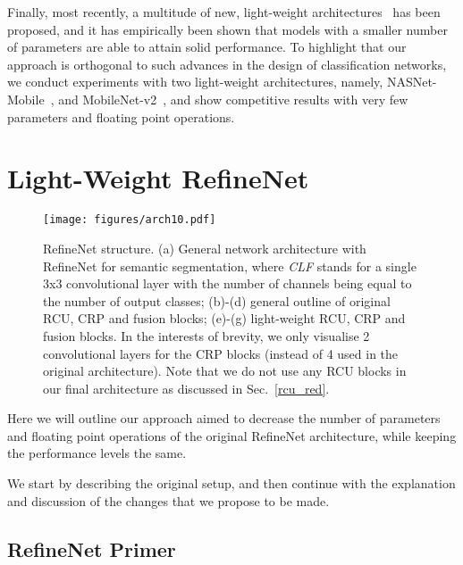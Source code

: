 \documentclass{bmvc2k}
\begin{document}
Finally, most recently, a multitude of new, light-weight architectures~\cite{IandolaMAHDK16,HowardZCKWWAA17} has been proposed, and it has empirically been shown that models with a smaller number of parameters are able to attain solid performance. To highlight that our approach is orthogonal to such advances in the design of classification networks, we conduct experiments with two light-weight architectures, namely, NASNet-Mobile~\cite{ZophVSL17}, and MobileNet-v2~\cite{abs-1801-04381}, and show competitive results with very few parameters and floating point operations.
\vspace{-0.12in}

\section{Light-Weight RefineNet}
\label{sec:blind}






\begin{figure*}
\begin{center}
	\texttt{[image: figures/arch10.pdf]}
\end{center}
	\vskip -0.23in
	\caption{RefineNet structure. (a) General network architecture with RefineNet for semantic segmentation, where \textit{CLF} stands for a single 3x3 convolutional layer with the number of channels being equal to the number of output classes; (b)-(d) general outline of original RCU, CRP and fusion blocks; (e)-(g) light-weight RCU, CRP and fusion blocks. In the interests of brevity, we only visualise 2 convolutional layers for the CRP blocks (instead of 4 used in the original architecture). Note that we do not use any RCU blocks in our final architecture as discussed in Sec.~\ref{rcu_red}.}
	\label{fig:arch}
	\vskip -0.2in
\end{figure*}

Here we will outline our approach aimed to decrease the number of parameters and floating point operations of the original RefineNet architecture, while keeping the performance levels the same.\par
We start by describing the original setup, and then continue with the explanation and discussion of the changes that we propose to be made.

\subsection{RefineNet Primer}
\end{document}
